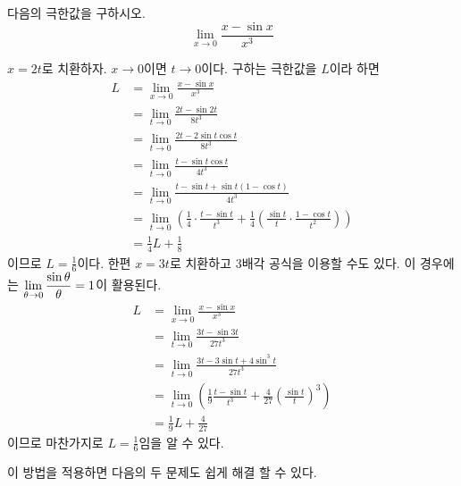 \documentclass[11pt, a4paper]{book}
\begin{document}
\vspace{1em}
\begin{example}
	다음의 극한값을 구하시오.
	\begin{equation*}
		\displaystyle\lim_{x\to 0}\frac{x-\sin x}{x^{3}}
	\end{equation*}

\begin{solution}
	 $x = 2t$로 치환하자. $x\to 0$이면 $t\to 0$이다. 구하는 극한값을 $L$이라 하면
	\begin{align*}
		L & =\displaystyle\lim_{x\to 0}\frac{x-\sin x}{x^{3}}\\
		& =\displaystyle\lim_{t\to 0}\frac{2t -\sin 2t}{8t^{3}}\\
		& =\displaystyle\lim_{t\to 0}\frac{2t - 2\sin t\cos t}{8t^{3}}\\
		& =\displaystyle\lim_{t\to 0}\frac{t-\sin t\cos t}{4t^{3}}\\
		& =\displaystyle\lim_{t\to 0}\frac{t-\sin t +\sin t(1-\cos t)}{4t^{3}}\\
		& =\displaystyle\lim_{t\to 0}\left(\frac{1}{4}\cdot \frac{t-\sin t}{t^{3}}+\frac{1}{4}\left(\frac{\sin t}{t} \cdot \frac{1-\cos t}{t^{2}}\right)\right)\\
		& =\frac{1}{4}L +\frac{1}{8}
	\end{align*}
	이므로 $L =\frac{1}{6}$이다. 한편 $x = 3t$로 치환하고 3배각 공식을 이용할 수도 있다. 이 경우에는 $\displaystyle \displaystyle\lim_{\theta\to 0} \frac{\sin{\theta}}{\theta}=1$이 활용된다.
		\begin{align*}
		L & =\displaystyle\lim_{x\to 0}\frac{x-\sin x}{x^{3}}\\
		& =\displaystyle\lim_{t\to 0}\frac{3t -\sin 3t}{27t^{3}}\\
		& =\displaystyle\lim_{t\to 0}\frac{3t - 3\sin t +4\sin^{3}t}{27t^{3}}\\
		& =\displaystyle\lim_{t\to 0}\left(\frac{1}{9}\frac{t-\sin t}{t^{3}}+\frac{4}{27}\left(\frac{\sin t}{t}\right)^{3}\right)\\
		& =\frac{1}{9}L +\frac{4}{27}
	\end{align*}
	이므로 마찬가지로 $L =\frac{1}{6}$임을 알 수 있다.
\end{solution}
\end{example}

	이 방법을 적용하면 다음의 두 문제도 쉽게 해결 할 수 있다. 
	\vspace{1em}
	
\end{document}
